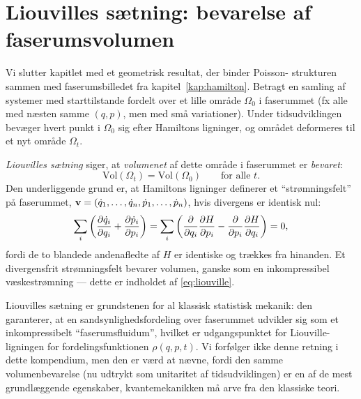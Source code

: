 \section{Liouvilles sætning: bevarelse af faserumsvolumen}

Vi slutter kapitlet med et geometrisk resultat, der binder Poisson-
strukturen sammen med faserumsbilledet fra
kapitel~\ref{kap:hamilton}. Betragt en samling af systemer med
starttilstande fordelt over et lille område $\Omega_0$ i faserummet
(fx alle med næsten samme $(q,p)$, men med små variationer). Under
tidsudviklingen bevæger hvert punkt i $\Omega_0$ sig efter Hamiltons
ligninger, og området deformeres til et nyt område $\Omega_t$.

\emph{Liouvilles sætning} siger, at \emph{volumenet} af dette område i
faserummet er \emph{bevaret}:
\begin{equation}
  \text{Vol}(\Omega_t) = \text{Vol}(\Omega_0) \qquad \text{for alle } t.
  \label{eq:liouville}
\end{equation}
Den underliggende grund er, at Hamiltons ligninger definerer et
``strømningsfelt'' på faserummet,
$\vb{v}=(\dot q_1,\dots,\dot q_n,\dot p_1,\dots,\dot p_n)$, hvis
divergens er identisk nul:
\begin{equation}
  \sum_i\left(\pdv{\dot q_i}{q_i} + \pdv{\dot p_i}{p_i}\right)
  = \sum_i\left(\pdv{}{q_i}\pdv{H}{p_i} - \pdv{}{p_i}\pdv{H}{q_i}\right) = 0,
\end{equation}
fordi de to blandede andenafledte af $H$ er identiske og trækkes fra
hinanden. Et divergensfrit strømningsfelt bevarer volumen, ganske som
en inkompressibel væskestrømning — dette er indholdet af
\eqref{eq:liouville}.

\begin{bemaerkning}
Liouvilles sætning er grundstenen for al klassisk statistisk mekanik:
den garanterer, at en sandsynlighedsfordeling over faserummet
udvikler sig som et inkompressibelt ``faserumsfluidum'', hvilket er
udgangspunktet for Liouville-ligningen for fordelingsfunktionen
$\rho(q,p,t)$. Vi forfølger ikke denne retning i dette kompendium, men
den er værd at nævne, fordi den samme volumenbevarelse (nu udtrykt som
unitaritet af tidsudviklingen) er en af de mest grundlæggende
egenskaber, kvantemekanikken må arve fra den klassiske teori.
\end{bemaerkning}

